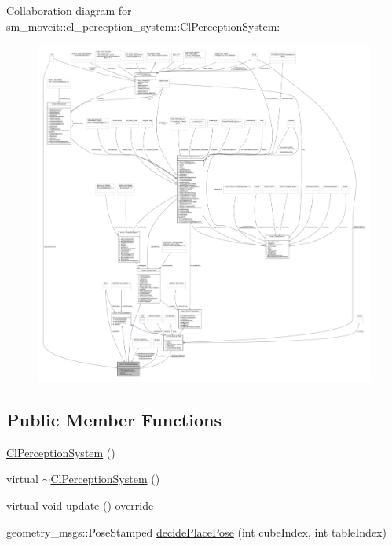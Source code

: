 Collaboration diagram for sm\+\_\+moveit\+:\+:cl\+\_\+perception\+\_\+system\+:\+:Cl\+Perception\+System\+:
\nopagebreak
\begin{figure}[H]
\begin{center}
\leavevmode
\includegraphics[width=350pt]{classsm__moveit_1_1cl__perception__system_1_1ClPerceptionSystem__coll__graph}
\end{center}
\end{figure}
\subsection*{Public Member Functions}
\begin{DoxyCompactItemize}
\item 
\hyperlink{classsm__moveit_1_1cl__perception__system_1_1ClPerceptionSystem_a4b639b726c3ce5dedcf76b2d27af337b}{Cl\+Perception\+System} ()
\item 
virtual \hyperlink{classsm__moveit_1_1cl__perception__system_1_1ClPerceptionSystem_ab2ebdb3a000c537ea5d38872c9fcc75b}{$\sim$\+Cl\+Perception\+System} ()
\item 
virtual void \hyperlink{classsm__moveit_1_1cl__perception__system_1_1ClPerceptionSystem_aaefca9001d3836655d38ee92621c013e}{update} () override
\item 
geometry\+\_\+msgs\+::\+Pose\+Stamped \hyperlink{classsm__moveit_1_1cl__perception__system_1_1ClPerceptionSystem_a334b3cd8a7172d4b55ff712bfa30069b}{decide\+Place\+Pose} (int cube\+Index, int table\+Index)
\end{DoxyCompactItemize}
